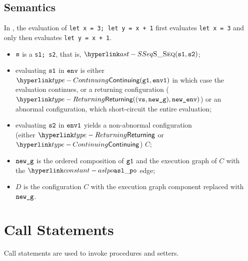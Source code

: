 \subsection{Semantics}
In ,
the evaluation of \texttt{let x = 3; let y = x + 1} first evaluates \texttt{let x = 3} and only then
evaluates \texttt{let y = x + 1}.

\ProseParagraph
\AllApply
\begin{itemize}
  \item $\vs$ is a \sequencingstatementterm{} \texttt{s1; s2}, that is, $\SSeq(\vsone, \vstwo)$;
  \item evaluating $\vsone$ in $\env$ is either $\Continuing(\vgone, \envone)$ in which case
        the evaluation continues,
        or a returning configuration ($\Returning((\vvs, \newg), \newenv)$)
        or an abnormal configuration, which short-circuit the entire evaluation;
  \item evaluating $\vstwo$ in $\envone$ yields a non-abnormal configuration \\
        (either $\Returning$ or $\Continuing$) $C$\ProseOrAbnormal;
  \item $\newg$ is the ordered composition of $\vgone$ and the execution graph of $C$ with the
        $\aslpo$ edge;
  \item $D$ is the configuration $C$ with the execution graph component replaced with $\newg$.
\end{itemize}

\FormallyParagraph
\begin{mathpar}
\end{mathpar}

\section{Call Statements\label{sec:CallStatements}}
\hypertarget{def-callstatementterm}{}
Call statements are used to invoke procedures and setters.

